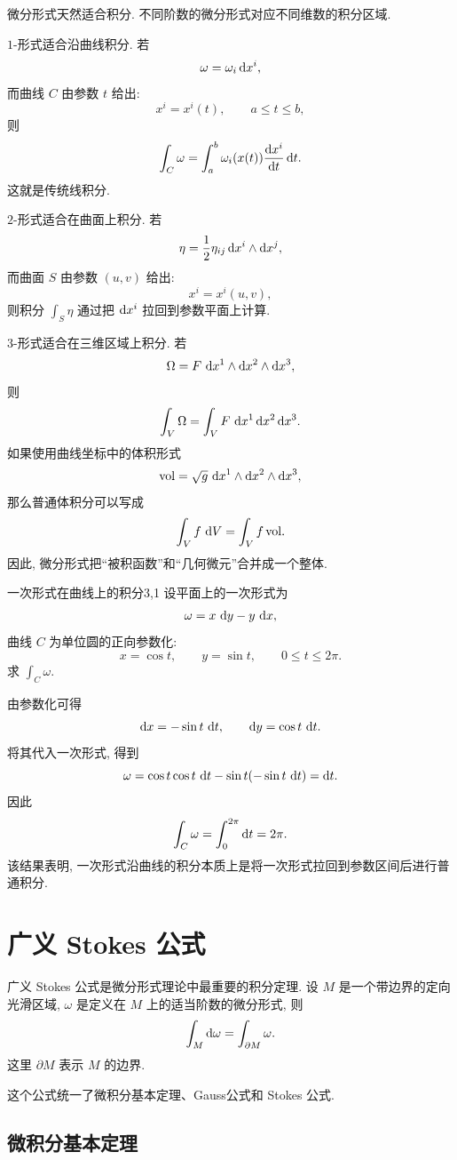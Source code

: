 微分形式天然适合积分. 不同阶数的微分形式对应不同维数的积分区域. 

$1$-形式适合沿曲线积分. 若
\[
\omega=\omega_i \mathop{}\!\mathrm{d} x^i,
\]
而曲线 $C$ 由参数 $t$ 给出: 
\[
x^i=x^i(t),
\qquad
a\leq t\leq b,
\]
则
\[
\int_C\omega
=
\int_a^b
\omega_i(x(t))
\frac{\mathop{}\!\mathrm{d} x^i}{\mathop{}\!\mathrm{d} t}
\mathop{}\!\mathrm{d} t.
\]
这就是传统线积分. 

$2$-形式适合在曲面上积分. 若
\[
\eta
=
\frac{1}{2}\eta_{ij}\mathop{}\!\mathrm{d} x^i\wedge \mathop{}\!\mathrm{d} x^j,
\]
而曲面 $S$ 由参数 $(u,v)$ 给出: 
\[
x^i=x^i(u,v),
\]
则积分 $\int_S\eta$ 通过把 $\mathop{}\!\mathrm{d} x^i$ 拉回到参数平面上计算. 

$3$-形式适合在三维区域上积分. 若
\[
\Omega=F\,\mathop{}\!\mathrm{d} x^1\wedge \mathop{}\!\mathrm{d} x^2\wedge \mathop{}\!\mathrm{d} x^3,
\]
则
\[
\int_V\Omega
=
\int_V F\,\mathop{}\!\mathrm{d} x^1\mathop{}\!\mathrm{d} x^2\mathop{}\!\mathrm{d} x^3.
\]
如果使用曲线坐标中的体积形式
\[
\mathrm{vol}
=
\sqrt{g}\,\mathop{}\!\mathrm{d} x^1\wedge \mathop{}\!\mathrm{d} x^2\wedge \mathop{}\!\mathrm{d} x^3,
\]
那么普通体积分可以写成
\[
\int_V f\,\mathop{}\!\mathrm{d} V
=
\int_V f\,\mathrm{vol}.
\]
因此, 微分形式把“被积函数”和“几何微元”合并成一个整体. 

\begin{example}{一次形式在曲线上的积分}{3,1}
设平面上的一次形式为
\[
\omega=x\,\mathop{}\!\mathrm{d} y-y\,\mathop{}\!\mathrm{d} x,
\]
曲线 $C$ 为单位圆的正向参数化: 
\[
x=\cos t,\qquad y=\sin t,\qquad 0\leq t\leq 2\pi.
\]
求 $\int_C\omega$. 
\begin{solution}
	由参数化可得
	\[
	\mathop{}\!\mathrm{d} x=-\sin t\,\mathop{}\!\mathrm{d} t,
	\qquad
	\mathop{}\!\mathrm{d} y=\cos t\,\mathop{}\!\mathrm{d} t.
	\]
	将其代入一次形式, 得到
	\[
	\omega
	=
	\cos t\cos t\,\mathop{}\!\mathrm{d} t
	-
	\sin t(-\sin t\,\mathop{}\!\mathrm{d} t)
	=
	\mathop{}\!\mathrm{d} t.
	\]
	因此
	\[
	\int_C\omega
	=
	\int_0^{2\pi}\mathop{}\!\mathrm{d} t
	=
	2\pi.
	\]
	该结果表明, 一次形式沿曲线的积分本质上是将一次形式拉回到参数区间后进行普通积分. 
\end{solution}
\end{example}

\section{广义 Stokes 公式}

广义 Stokes 公式是微分形式理论中最重要的积分定理. 设 $M$ 是一个带边界的定向光滑区域, $\omega$ 是定义在 $M$ 上的适当阶数的微分形式, 则
\begin{equation}
	\int_M \mathop{}\!\mathrm{d}\omega
=
\int_{\partial M}\omega.
\end{equation}
这里 $\partial M$ 表示 $M$ 的边界. 

这个公式统一了微积分基本定理、Gauss公式和 Stokes 公式. 

\subsection{微积分基本定理}

